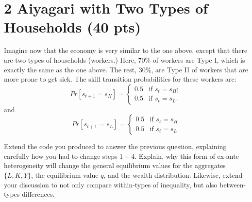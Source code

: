 \documentclass{article}
\begin{document}
\section*{2 Aiyagari with Two Types of Households (40 pts)}

Imagine now that the economy is very similar to the one above, except that there are two types of households (workers.) Here, 70\% of workers are Type I, which is exactly the same as the one above.
The rest, 30\%, are Type II of workers that are more prone to get sick.
The skill transition probabilities for these workers are:
\begin{equation*}
Pr[s_{t+1}=s_{H}]=\begin{cases}0.5&\text{if } s_{t}=s_{H};\\ 0.5&\text{if } s_{t}=s_{L}.\end{cases}
\end{equation*}
and
\begin{equation*}
Pr[s_{t+1}=s_{L}]=\begin{cases}0.5&\text{if } s_{t}=s_{H}\\ 0.5&\text{if } s_{t}=s_{L}\end{cases}
\end{equation*}

Extend the code you produced to answer the previous question, explaining carefully how you had to change steps $1-4$. Explain, why this form of ex-ante heterogeneity will change the general equilibrium values for the aggregates $\{L, K, Y\}$, the equilibrium value $q$, and the wealth distribution.
Likewise, extend your discussion to not only compare within-types of inequality, but also between-types differences.
\end{document}
